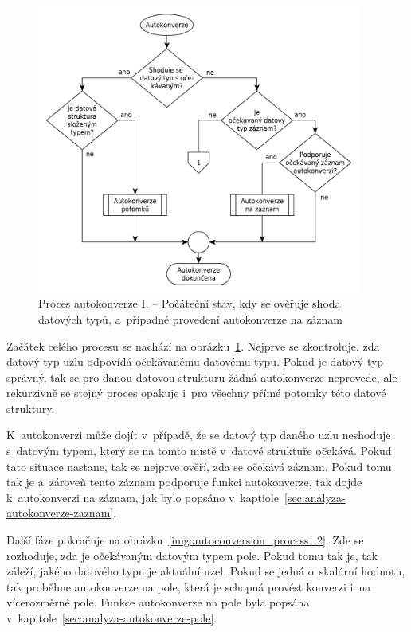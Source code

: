\documentclass[FM,bw,DP]{tulthesis}
\begin{document}
\begin{figure}[h]
	\centering
    \includegraphics[width=0.95\textwidth]{../img/autoconversion_process.pdf}
    \caption[Proces autokonverze I.]{Proces autokonverze I. -- Počáteční stav, kdy se ověřuje shoda datových typů, a~případné provedení autokonverze na záznam}
	\label{img:autoconversion_process}
\end{figure}

Začátek celého procesu se nachází na obrázku~\ref{img:autoconversion_process}.  Nejprve se zkontroluje, zda datový typ uzlu odpovídá očekávanému datovému typu. Pokud je datový typ správný, tak se pro danou datovou strukturu žádná autokonverze neprovede, ale rekurzivně se stejný proces opakuje i~pro všechny přímé potomky této datové struktury.

K~autokonverzi může dojít v~případě, že se datový typ daného uzlu neshoduje s~datovým typem, který se na tomto místě v~datové struktuře očekává. Pokud tato situace nastane, tak se nejprve ověří, zda se očekává záznam. Pokud tomu tak je a~zároveň tento záznam podporuje funkci autokonverze, tak dojde k~autokonverzi na záznam, jak bylo popsáno v~kaptiole~\ref{sec:analyza-autokonverze-zaznam}.

\clearpage

Další fáze pokračuje na obrázku~\ref{img:autoconversion_process_2}. Zde se rozhoduje, zda je očekávaným datovým typem pole. Pokud tomu tak je, tak záleží, jakého datového typu je aktuální uzel. Pokud se jedná o~skalární hodnotu, tak proběhne autokonverze na pole, která je schopná provést konverzi i~na vícerozměrné pole. Funkce autokonverze na pole byla popsána v~kapitole~\ref{sec:analyza-autokonverze-pole}.
\end{document}
